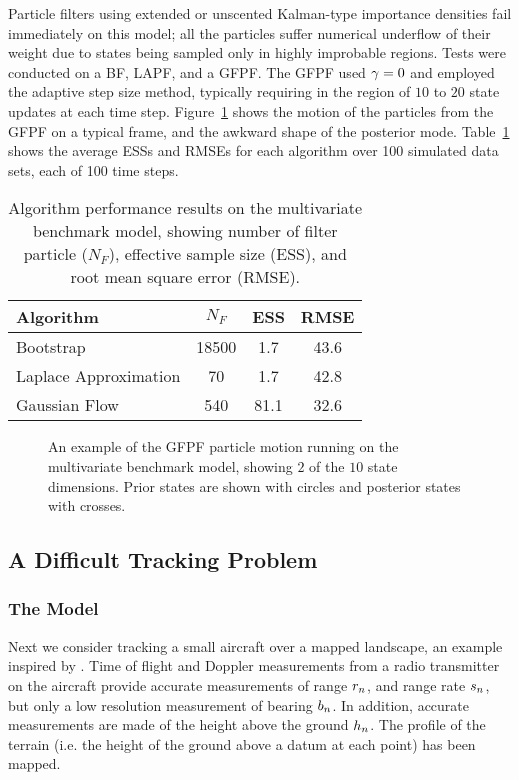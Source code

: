\documentclass[12pt]{article}
\begin{document}
Particle filters using extended or unscented Kalman-type importance densities fail immediately on this model; all the particles suffer numerical underflow of their weight due to states being sampled only in highly improbable regions. Tests were conducted on a BF, LAPF, and a GFPF. The GFPF used $\gamma=0$ and employed the adaptive step size method, typically requiring in the region of $10$ to $20$ state updates at each time step. Figure~\ref{fig:nlng_example_frame} shows the motion of the particles from the GFPF on a typical frame, and the awkward shape of the posterior mode. Table~\ref{tab:nlng_results} shows the average ESSs and RMSEs for each algorithm over 100 simulated data sets, each of 100 time steps.
%
\begin{table}
\centering
\begin{tabular}{l||c|c|c}
Algorithm                                & $N_F$ & ESS  & RMSE \\
\hline
Bootstrap                                & 18500 &  1.7 & 43.6 \\
Laplace Approximation                    &    70 &  1.7 & 42.8 \\
Gaussian Flow                            &   540 & 81.1 & 32.6 \\
\end{tabular}
\caption{Algorithm performance results on the multivariate benchmark model, showing number of filter particle ($N_F$), effective sample size (ESS), and root mean square error (RMSE).}
\label{tab:nlng_results}
\end{table}
%
\begin{figure}
\centering

\caption{An example of the GFPF particle motion running on the multivariate benchmark model, showing $2$ of the $10$ state dimensions. Prior states are shown with circles and posterior states with crosses.}
\label{fig:nlng_example_frame}
\end{figure}



\subsection{A Difficult Tracking Problem} \label{sec:numsim:tracking}

\subsubsection{The Model}

Next we consider tracking a small aircraft over a mapped landscape, an example inspired by \cite{Schon2005}. Time of flight and Doppler measurements from a radio transmitter on the aircraft provide accurate measurements of range $r_{n}$, and range rate $s_{n}$, but only a low resolution measurement of bearing $b_{n}$. In addition, accurate measurements are made of the height above the ground $h_{n}$. The profile of the terrain (i.e. the height of the ground above a datum at each point) has been mapped.
\end{document}
